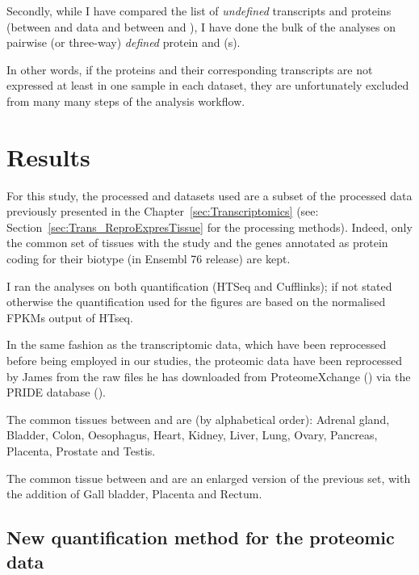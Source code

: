 Secondly, while I have compared the list of \emph{undefined} transcripts and
proteins (between  and  data and
between  and ), I have done the bulk of the
analyses on pairwise (or three-way) \emph{defined} protein and \mRNA(s).

In other words, if the proteins and their corresponding transcripts are not
expressed at least in one sample in each dataset, they are unfortunately excluded
from many many steps of the analysis workflow.

\section{Results}
\label{sec:IntegrationResults}

For this study, the processed  and  datasets
used are a subset of the processed data previously presented in the
Chapter~\ref{sec:Transcriptomics} (see: Section~\ref{sec:Trans_ReproExpresTissue}
for the processing methods). Indeed, only the common set of tissues with the
 study and the genes annotated as protein coding for their
biotype (in Ensembl 76 release) are kept.

I ran the analyses on both quantification (HTSeq and Cufflinks); if not stated
otherwise the quantification used for the figures are based on the normalised
\glspl{FPKM} output of HTseq.


In the same fashion as the transcriptomic data, which have been reprocessed before
being employed in our studies, the proteomic data have been reprocessed
by James from the raw files he has downloaded from ProteomeXchange
(\cite{ProteomeXchange:2014}) via the PRIDE database (\cite{Pride:2016}).

The common tissues between  and  are
(by alphabetical order):  Adrenal gland, Bladder, Colon, Oesophagus, Heart,
Kidney, Liver, Lung, Ovary, Pancreas, Placenta, Prostate and Testis.

The common tissue between  and  are
an enlarged version of the previous set, with the addition of Gall bladder,
Placenta and Rectum.

\subsection{New quantification method for the proteomic data}
\label{sec:IntegrationNewMethQuant}


